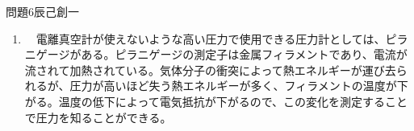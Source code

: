\documentclass[fleqn]{jbook}
\begin{document}
\begin{answer}{問題6}{辰己創一}
\begin{enumerate}
\begin{enumerate}
    \item 　イオン電流の値はその気体の衝突断面積に左右される，衝突断面積は電子の運動エネルギーと気体の種類に依存するが，一義的には気体分子の大きさによると考えてよい。特にそれは希ガス元素の場合その反応性の乏しさから逆に顕著であると考えてよい。このことは大きな分子ほど衝突断面積が大きくなると考えてよく，これにより分子量が増えるほどイオン電流が大きくなることが予想でき，実際にそうなっていることが確かめられている。\\
    
    \item 　グリッドに衝突する際，制動放射により放出されるX線はコレクターに到達した後に光電効果を起こしてコレクターの表面から電子を飛び出させる。このことが系に余計な電流を流すこととなり，誤差の原因となっている。このような誤差を小さくするにはコレクターの材質として電子を飛び出させるための仕事関数を出来るだけ大きくするようなものを選べばよい。その事により，光電効果により発生する電子の量を抑えることが出来，高真空度までの測定が可能となるのである。\\

\end{enumerate}

  \item 　電離真空計が使えないような高い圧力で使用できる圧力計としては、ピラニゲージがある。ピラニゲージの測定子は金属フィラメントであり、電流が流されて加熱されている。気体分子の衝突によって熱エネルギーが運び去られるが、圧力が高いほど失う熱エネルギーが多く、フィラメントの温度が下がる。温度の低下によって電気抵抗が下がるので、この変化を測定することで圧力を知ることができる。
\end{enumerate}


\end{answer}
\end{document}
